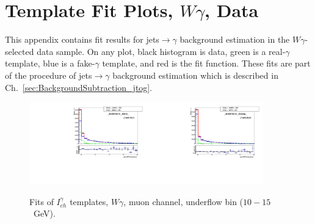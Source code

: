 \chapter{Template Fit Plots, $W\gamma$, Data}
\label{sec:TemplateFitPlots}

This appendix contains fit results for jets$\rightarrow \gamma$ background estimation in the $W\gamma$-selected data sample. On any plot, black histogram is data, green is a real-$\gamma$ template, blue is a fake-$\gamma$ template, and red is the fit function. These fits are part of the procedure of jets$\rightarrow\gamma$ background estimation which is described in Ch.~\ref{sec:BackgroundSubtraction_jtog}.


  

\begin{figure}[htb]
  \begin{center}
   \includegraphics[width=0.45\textwidth]{../figs/figs_v11/MUON_WGamma/TemplateFits/c_TEMPL_CHISO_UNblind__phoEt10to15__Barrel__RooFit.pdf}\includegraphics[width=0.45\textwidth]{../figs/figs_v11/MUON_WGamma/TemplateFits/c_TEMPL_CHISO_UNblind__phoEt10to15__Endcap__RooFit.pdf}\\
  \label{fig:templateFits_CHISO_MUON_0}
  \caption{Fits of $I_{ch}^{\gamma}$ templates, $W\gamma$, muon channel, underflow bin ($10-15$~GeV).}
  \end{center}
\end{figure}

